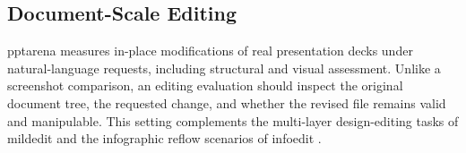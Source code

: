 \subsection{Document-Scale Editing}
\ac{pptarena} measures in-place modifications of real presentation decks under natural-language requests, including structural and visual assessment.
Unlike a screenshot comparison, an editing evaluation should inspect the original document tree, the requested change, and whether the revised file remains valid and manipulable.
This setting complements the multi-layer design-editing tasks of \ac{mildedit} and the infographic reflow scenarios of \ac{infoedit} \citep{mildedit2026,yang2026infoedit}.
